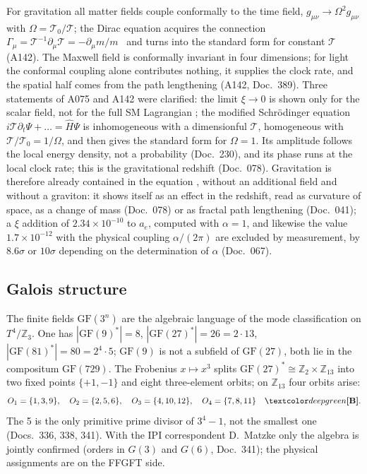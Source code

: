 For gravitation all matter fields couple conformally to the time field, $g_{\mu\nu}\to
\Omega^2g_{\mu\nu}$ with $\Omega=\mathcal T_0/\mathcal T$; the Dirac equation acquires the
connection $\Gamma_\mu=\mathcal T^{-1}\partial_\mu\mathcal T=-\partial_\mu m/m$ \KM\ and turns into
the standard form for constant $\mathcal T$ (A142). The Maxwell field is conformally invariant in
four dimensions; for light the conformal coupling alone contributes nothing, it supplies the clock
rate, and the spatial half comes from the path lengthening (A142, Doc.~389). Three statements of A075 and A142 were clarified: the limit $\xi\to0$ is shown only for the scalar field, not for the full SM
Lagrangian \SM; the modified Schrödinger equation $i\mathcal T\partial_t\Psi+\ldots=\hat H\Psi$ is
inhomogeneous with a dimensionful $\mathcal T$, homogeneous with $\mathcal T/\mathcal T_0=1/\Omega$,
and then gives the standard form for $\Omega=1$. Its amplitude follows the local energy density,
not a probability (Doc.~230), and its phase runs at the local clock rate; this is the
gravitational redshift (Doc.~078). Gravitation is therefore already contained in the equation
\BM\KM, without an additional field and without a graviton: it shows itself as an effect in the
redshift, read as curvature of space, as a change of mass (Doc.~078) or as fractal path lengthening
(Doc.~041); a $\xi$
addition of $2.34\times10^{-10}$ to $a_e$, computed with $\alpha=1$, and likewise the value
$1.7\times10^{-12}$ with the physical coupling $\alpha/(2\pi)$ are excluded by measurement, by $8.6\sigma$
or $10\sigma$ depending on the determination of $\alpha$ (Doc.~067).

\subsection{Galois structure}

The finite fields $\mathrm{GF}(3^n)$ are the algebraic language of the mode classification on
$T^4/\mathbb Z_3$. One has $|\mathrm{GF}(9)^*|=8$, $|\mathrm{GF}(27)^*|=26=2\cdot13$,
$|\mathrm{GF}(81)^*|=80=2^4\cdot5$; $\mathrm{GF}(9)$ is not a subfield of $\mathrm{GF}(27)$, both
lie in the compositum $\mathrm{GF}(729)$. The Frobenius $x\mapsto x^3$ splits
$\mathrm{GF}(27)^*\cong\mathbb Z_2\times\mathbb Z_{13}$ into two fixed points $\{+1,-1\}$ and
eight three-element orbits; on $\mathbb Z_{13}$ four orbits arise:
\begin{equation}
  O_1=\{1,3,9\},\quad O_2=\{2,5,6\},\quad O_3=\{4,10,12\},\quad O_4=\{7,8,11\}\quad\BM .
\end{equation}
The 5 is the only primitive prime divisor of $3^4-1$, not the smallest one (Docs.~336, 338,
341). With the IPI correspondent D.~Matzke only the algebra is jointly confirmed (orders in $G(3)$
and $G(6)$, Doc.~341); the physical assignments are on the FFGFT side.

